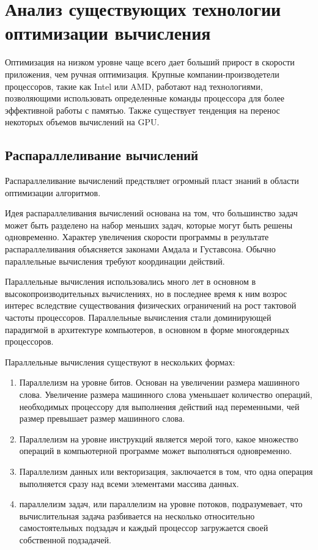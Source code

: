 \section{Анализ существующих технологии оптимизации вычисления}
Оптимизация на низком уровне чаще всего дает больший прирост в скорости приложения, чем ручная оптимизация. Крупные компании-производетели процессоров, такие как Intel или AMD, работают над технологиями, позволяющими использовать определенные команды процессора для более эффективной работы с памятью. Также существует тенденция на перенос некоторых объемов вычислений на GPU. 

\subsection{Распараллеливание вычислений}
Распараллеливание вычислений предствляет огромный пласт знаний в области оптимизации алгоритмов. 

Идея распараллеливания вычислений основана на том, что большинство задач может быть разделено на набор меньших задач, которые могут быть решены одновременно. Характер увеличения скорости программы в результате распараллеливания объясняется законами Амдала и Густавсона. Обычно параллельные вычисления требуют координации действий.  

Параллельные вычисления использовались много лет в основном в высокопроизводительных вычислениях, но в последнее время к ним возрос интерес вследствие существования физических ограничений на рост тактовой частоты процессоров. Параллельные вычисления стали доминирующей парадигмой в архитектуре компьютеров, в основном в форме многоядерных процессоров.\cite{bib3}

Параллельные вычисления существуют в нескольких формах: 
\begin{enumerate}
\item Параллелизм на уровне битов. Основан на увеличении размера машинного слова. Увеличение размера машинного слова уменьшает количество операций, необходимых процессору для выполнения действий над переменными, чей размер превышает размер машинного слова.
\item Параллелизм на уровне инструкций является мерой того, какое множество операций в компьютерной программе может выполняться одновременно. 
\item Параллелизм данных или векторизация, заключается в том, что одна операция выполняется сразу над всеми элементами массива данных.
\item параллелизм задач, или параллелизм на уровне потоков, подразумевает, что вычислительная задача разбивается на несколько относительно самостоятельных подзадач и каждый процессор загружается своей собственной подзадачей.
\end{enumerate}

